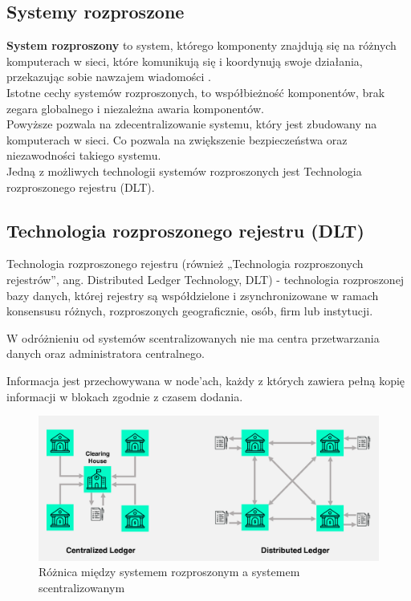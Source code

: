 \documentclass[12pt]{article}
\newenvironment{centerfig}
{\begin{figure}[H]\centering}
{\end{figure}}
\begin{document}
\subsection{Systemy rozproszone}

\textbf{System rozproszony} to system, którego komponenty znajdują się na różnych komputerach w sieci, które komunikują się i koordynują swoje działania, przekazując sobie nawzajem wiadomości \cite{wiki-sr}. \\
Istotne cechy systemów rozproszonych, to współbieżność komponentów, brak zegara globalnego i niezależna awaria komponentów. \\
Powyższe pozwala na zdecentralizowanie systemu, który jest zbudowany na komputerach w sieci. Co pozwala na zwiększenie bezpieczeństwa oraz niezawodności takiego systemu.\\
Jedną z możliwych technologii systemów rozproszonych jest Technologia rozproszonego rejestru (DLT). \\
\subsection{Technologia rozproszonego rejestru (DLT)}
Technologia rozproszonego rejestru (również „Technologia rozproszonych rejestrów”, ang. Distributed Ledger Technology, DLT) - technologia rozproszonej bazy danych, której rejestry są współdzielone i zsynchronizowane w ramach konsensusu różnych, rozproszonych geograficznie, osób, firm lub instytucji. \cite{wiki-dlt}

W odróżnieniu od systemów scentralizowanych nie ma centra przetwarzania danych oraz administratora centralnego.

Informacja jest przechowywana w node'ach, każdy z których zawiera pełną kopię informacji w blokach zgodnie z czasem dodania.

\begin{centerfig}
  \includegraphics[width=\textwidth]{1.png}
  \caption{Różnica między systemem rozproszonym a systemem scentralizowanym \cite{sceta}}
\end{centerfig}
\end{document}
